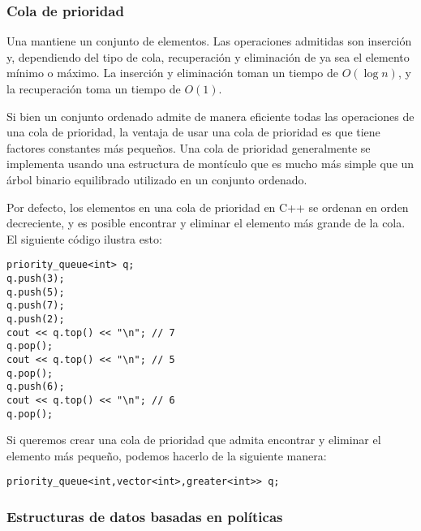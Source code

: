 \subsubsection{Cola de prioridad}


Una 
mantiene un conjunto de elementos.
Las operaciones admitidas son inserción y,
dependiendo del tipo de cola,
recuperación y eliminación de
ya sea el elemento mínimo o máximo.
La inserción y eliminación toman un tiempo de $O(\log n)$,
y la recuperación toma un tiempo de $O(1)$.

Si bien un conjunto ordenado admite de manera eficiente
todas las operaciones de una cola de prioridad,
la ventaja de usar una cola de prioridad es
que tiene factores constantes más pequeños.
Una cola de prioridad generalmente se implementa usando
una estructura de montículo que es mucho más simple que un
árbol binario equilibrado utilizado en un conjunto ordenado.

\begin{samepage}
Por defecto, los elementos en una cola de prioridad en C++
se ordenan en orden decreciente,
y es posible encontrar y eliminar el
elemento más grande de la cola.
El siguiente código ilustra esto:

\begin{lstlisting}
priority_queue<int> q;
q.push(3);
q.push(5);
q.push(7);
q.push(2);
cout << q.top() << "\n"; // 7
q.pop();
cout << q.top() << "\n"; // 5
q.pop();
q.push(6);
cout << q.top() << "\n"; // 6
q.pop();
\end{lstlisting}
\end{samepage}

Si queremos crear una cola de prioridad
que admita encontrar y eliminar
el elemento más pequeño,
podemos hacerlo de la siguiente manera:

\begin{lstlisting}
priority_queue<int,vector<int>,greater<int>> q;
\end{lstlisting}

\subsubsection{Estructuras de datos basadas en políticas}

